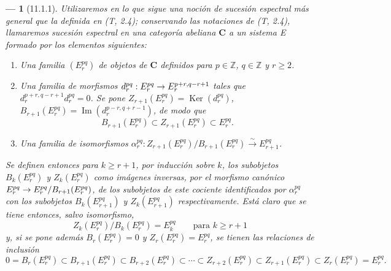 \documentclass[10pt,oneside,openany]{book}
\theoremstyle{egaenv}\newtheorem*{env}{---}
\theoremstyle{egastatement}
\theoremstyle{egadescription}
\renewcommand{\geq}{\geqslant}
\renewcommand{\to}{\mathchoice{\longrightarrow}{\rightarrow}{\rightarrow}{\rightarrow}}
\begin{document}
\begin{env}[11.1.1]
\label{0.11.1.1-fr}
Utilizaremos en lo que sigue una noción de sucesión espectral más general que
la definida en (T, 2.4); conservando las notaciones de (T, 2.4),
llamaremos \emph{sucesión espectral} en una categoría abeliana $\boldsymbol{C}$ a un
sistema E formado por los elementos siguientes:
\begin{enumerate}
  \item[$a)$] Una familia $(E_r^{pq})$ de objetos de $\boldsymbol{C}$ definidos para
    $p\in\mathbb Z$, $q\in\mathbb Z$ y $r\geq2$.
  \item[$b)$] Una familia de morfismos
    $d_r^{pq}:E_r^{pq}\to E_r^{p+r,q-r+1}$ tales que
    $d_r^{p+r,q-r+1}d_r^{pq}=0$. Se pone
    $Z_{r+1}(E_r^{pq})=\operatorname{Ker}(d_r^{pq})$,
    $B_{r+1}(E_r^{pq})=\operatorname{Im}(d_r^{p-r,q+r-1})$, de modo que
    \[
      B_{r+1}(E_r^{pq})\subset Z_{r+1}(E_r^{pq})\subset E_r^{pq}.
    \]
  \item[$c)$] Una familia de isomorfismos
    $\alpha_r^{pq}:Z_{r+1}(E_r^{pq})/B_{r+1}(E_r^{pq})
    \xrightarrow{\sim}E_{r+1}^{pq}$.
\end{enumerate}

Se definen entonces para $k\geq r+1$, por inducción sobre $k$, los subobjetos
$B_k(E_r^{pq})$ y $Z_k(E_r^{pq})$ como imágenes inversas, por el morfismo
canónico $E_r^{pq}\to E_r^{pq}/B_{r+1}(E_r^{pq})$, de los subobjetos de este
cociente identificados por $\alpha_r^{pq}$ con los subobjetos $B_k(E_{r+1}^{pq})$ y
$Z_k(E_{r+1}^{pq})$ respectivamente. Está claro que se tiene entonces, salvo
isomorfismo,
\[
\label{0.11.1.1.1-fr}
  Z_k(E_r^{pq})/B_k(E_r^{pq})=E_k^{pq}
  \qquad\text{para }k\geq r+1
  \tag{11.1.1.1}
\]
y, si se pone además $B_r(E_r^{pq})=0$ y $Z_r(E_r^{pq})=E_r^{pq}$, se tienen
las relaciones de inclusión
\[
\label{0.11.1.1.2-fr}
  0=B_r(E_r^{pq})\subset B_{r+1}(E_r^{pq})\subset B_{r+2}(E_r^{pq})
  \subset\cdots\subset Z_{r+2}(E_r^{pq})\subset Z_{r+1}(E_r^{pq})
  \subset Z_r(E_r^{pq})=E_r^{pq}.
  \tag{11.1.1.2}
\]


\end{env}
\end{document}
